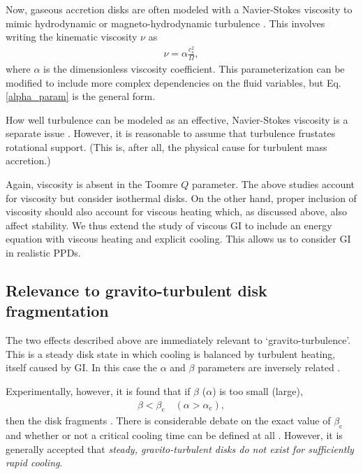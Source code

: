 \documentclass[iop, numberedappendix]{emulateapj}
\begin{document}
Now, gaseous accretion disks are often modeled with a Navier-Stokes viscosity
to mimic hydrodynamic or magneto-hydrodynamic turbulence
\citep{shakura73}. This involves writing the
kinematic viscosity $\nu$ as  
\begin{align}\label{alpha_param}
  \nu  = \alpha \frac{c_s^2}{\Omega}, %
\end{align}
where $\alpha$ is the dimensionless viscosity
coefficient. This
parameterization can be modified to include more complex dependencies on the
fluid variables, but Eq. \ref{alpha_param} is the general form. 

How well turbulence can be modeled as an effective, Navier-Stokes
viscosity is a separate issue \citep{balbus99}. However, it is 
reasonable to assume that turbulence frustates rotational 
support. (This is, after all, the physical cause for turbulent mass
accretion.)  

Again, viscosity is absent in the Toomre $Q$ parameter. The above
studies account for viscosity but consider isothermal disks. On the
other hand, proper inclusion of viscosity should also account for
viscous heating which, as discussed above, also affect stability. 
We thus extend the study of viscous GI to include an energy equation
with viscous heating and explicit cooling. This allows us to consider
GI in realistic PPDs.  



\subsection{Relevance to gravito-turbulent disk fragmentation}%
The two effects described above are immediately relevant to
`gravito-turbulence'. This is a steady disk state in which cooling is
balanced by turbulent heating, itself caused by GI. In this case 
the $\alpha$ and $\beta$ parameters are inversely related
\citep{gammie01}.   

Experimentally, however, it is found that if $\beta$ ($\alpha$) is
too small (large), 
\begin{align}
  \beta < \beta_\mathrm{c} \quad
  \left(\alpha>\alpha_\mathrm{c}\right), 
\end{align}
then the disk fragments \citep{gammie01,rice05,rice11}. 
There is considerable debate on the exact value of $\beta_\mathrm{c}$
and whether or not a critical cooling time can 
be defined at all \citep{meru11,meru12,paardekooper12}. However, it is
generally accepted that \emph{steady, gravito-turbulent disks do not
  exist for sufficiently rapid cooling}. 
\end{document}
